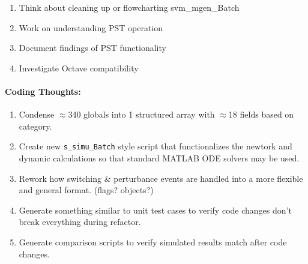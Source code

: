 \documentclass[12pt]{article}
\begin{document}
\begin{multicols}{2}
\begin{enumerate}
\begin{minipage}{\linewidth}
\begin{itemize}
						\end{itemize}
				\end{minipage}
		\item Think about cleaning up or flowcharting svm\_mgen\_Batch
		\item Work on understanding PST operation
		\item Document findings of PST functionality
		\item Investigate Octave compatibility
\end{enumerate}



\paragraph{Coding Thoughts:} 
	\begin{enumerate}

		\itemsep 0em 
		\item Condense $\approx$340 globals into 1 structured array with $\approx$18 fields based on category.
		\item Create new \verb|s_simu_Batch| style script that functionalizes the newtork and dynamic calculations so that standard MATLAB ODE solvers may be used.
		\item Rework how switching \& perturbance events are handled into a more flexible and general format. (flags? objects?)
		\item Generate something similar to unit test cases to verify code changes don't break everything during refactor.
		\item Generate comparison scripts to verify simulated results match after code changes.

	\end{enumerate}
	





\vfill\null
\end{multicols}
\end{document}
